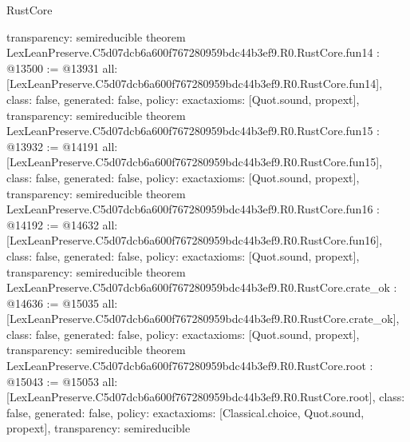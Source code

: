 \begin{lexlean}{RustCore}
\begin{coremodule}
{  transparency: semireducible
}
theorem LexLeanPreserve.C5d07dcb6a600f767280959bdc44b3ef9.R0.RustCore.fun14 : @13500 := @13931 {
  all: [LexLeanPreserve.C5d07dcb6a600f767280959bdc44b3ef9.R0.RustCore.fun14],
  class: false,
  generated: false,
  policy: exact{axioms: [Quot.sound, propext]},
  transparency: semireducible
}
theorem LexLeanPreserve.C5d07dcb6a600f767280959bdc44b3ef9.R0.RustCore.fun15 : @13932 := @14191 {
  all: [LexLeanPreserve.C5d07dcb6a600f767280959bdc44b3ef9.R0.RustCore.fun15],
  class: false,
  generated: false,
  policy: exact{axioms: [Quot.sound, propext]},
  transparency: semireducible
}
theorem LexLeanPreserve.C5d07dcb6a600f767280959bdc44b3ef9.R0.RustCore.fun16 : @14192 := @14632 {
  all: [LexLeanPreserve.C5d07dcb6a600f767280959bdc44b3ef9.R0.RustCore.fun16],
  class: false,
  generated: false,
  policy: exact{axioms: [Quot.sound, propext]},
  transparency: semireducible
}
theorem LexLeanPreserve.C5d07dcb6a600f767280959bdc44b3ef9.R0.RustCore.crate_ok : @14636 := @15035 {
  all: [LexLeanPreserve.C5d07dcb6a600f767280959bdc44b3ef9.R0.RustCore.crate_ok],
  class: false,
  generated: false,
  policy: exact{axioms: [Quot.sound, propext]},
  transparency: semireducible
}
theorem LexLeanPreserve.C5d07dcb6a600f767280959bdc44b3ef9.R0.RustCore.root : @15043 := @15053 {
  all: [LexLeanPreserve.C5d07dcb6a600f767280959bdc44b3ef9.R0.RustCore.root],
  class: false,
  generated: false,
  policy: exact{axioms: [Classical.choice, Quot.sound, propext]},
  transparency: semireducible
}


\end{coremodule}
\end{lexlean}
